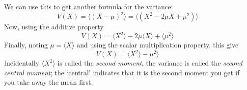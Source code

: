 \documentclass[11pt,a4paper]{scrartcl}
\begin{document}
We can use this to get another formula for the variance:
\begin{equation}
V(X)=\langle (X-\mu)^2\rangle=\langle (X^2-2\mu X+\mu^2)\rangle
\end{equation}
Now, using the additive property
\begin{equation}
V(X)=\langle X^2 \rangle -2\mu\langle X\rangle +\langle \mu^2 \rangle
\end{equation}
Finally, noting $\mu=\langle X\rangle$ and using the scalar multiplication property, this give
\begin{equation}
V(X)=\langle X^2 \rangle - \mu^2 \rangle
\end{equation}
Incidentally $\langle X^2\rangle$ is called the \textsl{second
  moment}, the variance is called the \textsl{second central moment};
the \lq{}central\rq{} indicates that it is the second moment you get
if you take away the mean first.
\end{document}
